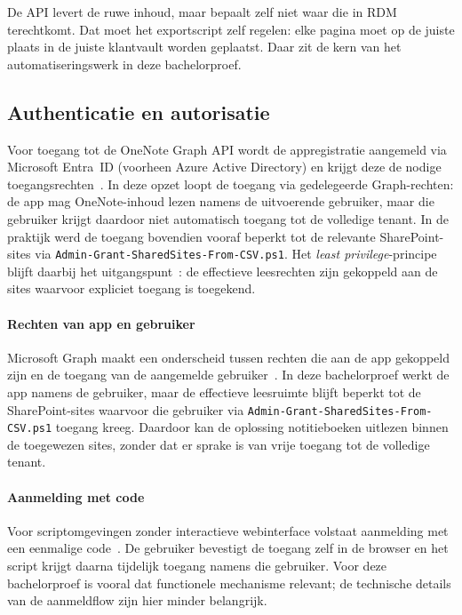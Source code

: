 De API levert de ruwe inhoud, maar bepaalt zelf niet waar die in RDM terechtkomt. Dat moet het exportscript zelf regelen: elke pagina moet op de juiste plaats in de juiste klantvault worden geplaatst. Daar zit de kern van het automatiseringswerk in deze bachelorproef.

\subsection{Authenticatie en autorisatie}
\label{subsec:graph-auth}

Voor toegang tot de OneNote Graph API wordt de appregistratie aangemeld via Microsoft Entra~ID (voorheen Azure Active Directory) en krijgt deze de nodige toegangsrechten~\autocite{microsoft2025entra}. In deze opzet loopt de toegang via gedelegeerde Graph-rechten: de app mag OneNote-inhoud lezen namens de uitvoerende gebruiker, maar die gebruiker krijgt daardoor niet automatisch toegang tot de volledige tenant. In de praktijk werd de toegang bovendien vooraf beperkt tot de relevante SharePoint-sites via \texttt{Admin-Grant-SharedSites-From-CSV.ps1}. Het \emph{least privilege}-principe blijft daarbij het uitgangspunt~\autocite{garbis2021pam}: de effectieve leesrechten zijn gekoppeld aan de sites waarvoor expliciet toegang is toegekend.

\paragraph{Rechten van app en gebruiker}
Microsoft Graph maakt een onderscheid tussen rechten die aan de app gekoppeld zijn en de toegang van de aangemelde gebruiker~\autocite{microsoft2025entra}. In deze bachelorproef werkt de app namens de gebruiker, maar de effectieve leesruimte blijft beperkt tot de SharePoint-sites waarvoor die gebruiker via \texttt{Admin-Grant-SharedSites-From-CSV.ps1} toegang kreeg. Daardoor kan de oplossing notitieboeken uitlezen binnen de toegewezen sites, zonder dat er sprake is van vrije toegang tot de volledige tenant.

\paragraph{Aanmelding met code}
Voor scriptomgevingen zonder interactieve webinterface volstaat aanmelding met een eenmalige code~\autocite{microsoft2025devicecode}. De gebruiker bevestigt de toegang zelf in de browser en het script krijgt daarna tijdelijk toegang namens die gebruiker. Voor deze bachelorproef is vooral dat functionele mechanisme relevant; de technische details van de aanmeldflow zijn hier minder belangrijk.

